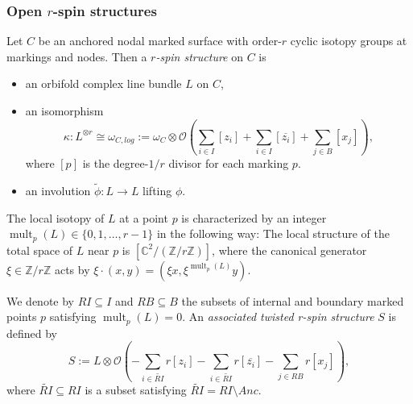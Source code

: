\documentclass[11pt]{amsart}
\theoremstyle{definition}
\theoremstyle{remark}
\newcommand{\<}{\left<}
\renewcommand{\>}{\right>}
\numberwithin{equation}{section}
\begin{document}
\subsubsection{Open $r$-spin structures}
Let $C$ be an anchored nodal marked surface with
order-$r$ cyclic isotopy groups at markings %
and nodes. Then a %
\textit{$r$-spin structure} on $C$ is 
\begin{itemize}
    \item 
 an orbifold complex line bundle $L$ on $C$,

\item an isomorphism 
$$\kappa:L^{\otimes r} \cong \omega_{C,log}:=\omega_{C} \otimes {\mathcal{O}}\left(\sum_{i \in I}  [z_i] + \sum_{i \in I}  [\overline{z_i}] + \sum_{j \in B} [x_j]\right),$$
where $[p]$ is the degree-$1/r$ divisor for each marking %
$p$. 

\item an %
involution $\widetilde{\phi}: L \to L$ lifting $\phi$.
\end{itemize}
The local isotopy of $L$ at a point $p$ is characterized by an integer $\operatorname{mult}_p(L)\in \{0,1,\dots,r-1\}$ in the following %
way: The local %
structure of the total space of $L$ near $p$ is $[\mathbb C^2/(\mathbb Z/r\mathbb Z)]$, where the canonical generator $\xi \in \mathbb Z/r\mathbb Z$ acts by $\xi\cdot (x,y)=(\xi x, \xi^{\operatorname{mult}_p(L)}y)$.

We denote by $RI\subseteq I$ and $RB\subseteq B$ the subsets of internal and boundary marked points $p$ satisfying $\operatorname{mult}_p(L)=0$. An \textit{associated twisted r-spin structure} $S$ is defined by
$$
S:=L\otimes \mathcal O\left( -\sum_{i \in \widetilde{RI}} r [z_i] - \sum_{i \in \widetilde{RI}} r [\overline{z_i}] - \sum_{j \in RB} r [x_j]\right),
$$
where $\widetilde{RI}\subseteq RI$ is a subset satisfying $\widetilde{RI}=RI \setminus Anc   $.
\end{document}
